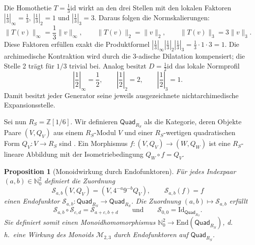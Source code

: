 \documentclass[11pt,a4paper]{article}
\newtheorem{proposition}[theorem]{Proposition}
\newcommand{\id}{\mathrm{id}}
\begin{document}
	Die Homothetie $T=\frac{1}{3}\id$ wirkt an den drei Stellen mit den lokalen Faktoren $|\frac{1}{3}|_\infty = \frac{1}{3}$, $|\frac{1}{3}|_2 = 1$ und $|\frac{1}{3}|_3 = 3$. Daraus folgen die Normskalierungen:
	\begin{equation}
		\|T(v)\|_\infty = \frac{1}{3}\|v\|_\infty, \qquad \|T(v)\|_2 = \|v\|_2, \qquad \|T(v)\|_3 = 3\|v\|_3.
	\end{equation}
	Diese Faktoren erfüllen exakt die Produktformel $|\frac{1}{3}|_\infty |\frac{1}{3}|_2 |\frac{1}{3}|_3 = \frac{1}{3} \cdot 1 \cdot 3 = 1$. Die archimedische Kontraktion wird durch die 3-adische Dilatation kompensiert; die Stelle 2 trägt für $1/3$ trivial bei. Analog besitzt $D=\frac{1}{2}\id$ das lokale Normprofil
	\begin{equation}
		\left|\frac{1}{2}\right|_\infty = \frac{1}{2}, \qquad \left|\frac{1}{2}\right|_2 = 2, \qquad \left|\frac{1}{2}\right|_3 = 1.
	\end{equation}
	Damit besitzt jeder Generator seine jeweils ausgezeichnete nichtarchimedische Expansionsstelle.
	
	Sei nun $R_S = \mathbb{Z}[1/6]$. Wir definieren $\mathsf{Quad}_{R_S}$ als die Kategorie, deren Objekte Paare $(V, Q_V)$ aus einem $R_S$-Modul $V$ und einer $R_S$-wertigen quadratischen Form $Q_V \colon V \to R_S$ sind \cite{cassels}. Ein Morphismus $f \colon (V, Q_V) \to (W, Q_W)$ ist eine $R_S$-lineare Abbildung mit der Isometriebedingung $Q_W \circ f = Q_V$.
	
	\begin{proposition}[Monoidwirkung durch Endofunktoren]
		Für jedes Indexpaar $(a,b) \in \mathbb{N}_0^2$ definiert die Zuordnung
		\begin{equation}
			\mathscr{S}_{a,b}(V, Q_V) = \left(V, 4^{-a}9^{-b}Q_V\right), \qquad \mathscr{S}_{a,b}(f) = f
		\end{equation}
		einen Endofunktor $\mathscr{S}_{a,b} \colon \mathsf{Quad}_{R_S} \to \mathsf{Quad}_{R_S}$. Die Zuordnung $(a,b) \mapsto \mathscr{S}_{a,b}$ erfüllt
		\begin{equation}
			\mathscr{S}_{a,b} \circ \mathscr{S}_{c,d} = \mathscr{S}_{a+c, b+d} \qquad \text{und} \qquad \mathscr{S}_{0,0} = \mathrm{Id}_{\mathsf{Quad}_{R_S}}.
		\end{equation}
		Sie definiert somit einen Monoidhomomorphismus $\mathbb{N}_0^2 \to \mathrm{End}(\mathsf{Quad}_{R_S})$, d.\,h.\ eine Wirkung des Monoids $\mathcal{M}_{2,3}$ durch Endofunktoren auf $\mathsf{Quad}_{R_S}$.
	\end{proposition}
	
\end{document}

